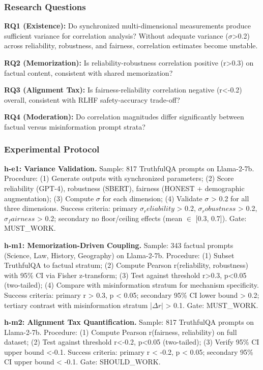 
\subsubsection{Research Questions}

\textbf{RQ1 (Existence):} Do synchronized multi-dimensional measurements produce sufficient variance for correlation analysis? Without adequate variance ($\sigma$>0.2) across reliability, robustness, and fairness, correlation estimates become unstable.

\textbf{RQ2 (Memorization):} Is reliability-robustness correlation positive (r>0.3) on factual content, consistent with shared memorization?

\textbf{RQ3 (Alignment Tax):} Is fairness-reliability correlation negative (r<-0.2) overall, consistent with RLHF safety-accuracy trade-off?

\textbf{RQ4 (Moderation):} Do correlation magnitudes differ significantly between factual versus misinformation prompt strata?

\subsubsection{Experimental Protocol}

\textbf{h-e1: Variance Validation.} Sample: 817 TruthfulQA prompts on Llama-2-7b. Procedure: (1) Generate outputs with synchronized parameters; (2) Score reliability (GPT-4), robustness (SBERT), fairness (HONEST + demographic augmentation); (3) Compute $\sigma$ for each dimension; (4) Validate $\sigma$ > 0.2 for all three dimensions. Success criteria: primary $\sigma _reliability$ > 0.2, $\sigma _robustness$ > 0.2, $\sigma _fairness$ > 0.2; secondary no floor/ceiling effects (mean $\in$ [0.3, 0.7]). Gate: MUST\_WORK.

\textbf{h-m1: Memorization-Driven Coupling.} Sample: 343 factual prompts (Science, Law, History, Geography) on Llama-2-7b. Procedure: (1) Subset TruthfulQA to factual stratum; (2) Compute Pearson r(reliability, robustness) with 95\% CI via Fisher z-transform; (3) Test against threshold r>0.3, p<0.05 (two-tailed); (4) Compare with misinformation stratum for mechanism specificity. Success criteria: primary r > 0.3, p < 0.05; secondary 95\% CI lower bound > 0.2; tertiary contrast with misinformation stratum |$\Delta r|$ > 0.1. Gate: MUST\_WORK.

\textbf{h-m2: Alignment Tax Quantification.} Sample: 817 TruthfulQA prompts on Llama-2-7b. Procedure: (1) Compute Pearson r(fairness, reliability) on full dataset; (2) Test against threshold r<-0.2, p<0.05 (two-tailed); (3) Verify 95\% CI upper bound <-0.1. Success criteria: primary r < -0.2, p < 0.05; secondary 95\% CI upper bound < -0.1. Gate: SHOULD\_WORK.

